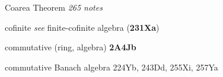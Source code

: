 Coarea Theorem {\it 265 notes}





























































cofinite {\it see} finite-cofinite algebra ({\bf 231Xa})






















commutative (ring, algebra) {\bf 2A4Jb}


commutative Banach algebra 224Yb, 243Dd, 255Xi, 257Ya
























